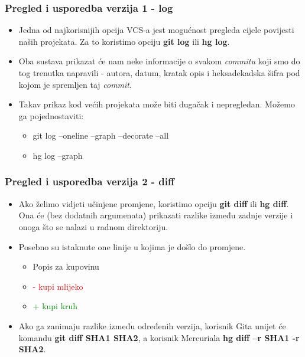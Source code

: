 \documentclass{beamer}
\begin{document}
	\begin{frame}
		\frametitle{Pregled i usporedba verzija 1 - log}
		\begin{itemize}
			\item Jedna od najkorisnijih opcija VCS-a jest mogućnost pregleda cijele povijesti naših projekata. Za to koristimo opciju \textbf{git log} ili \textbf{hg log}.
			\item Oba sustava prikazat će nam neke informacije o svakom \textit{commitu} koji smo do tog trenutka napravili - autora, datum, kratak opis i heksadekadska šifra pod kojom je spremljen taj \textit{commit}.
			\item Takav prikaz kod većih projekata može biti dugačak i nepregledan. Možemo ga pojednostaviti:
			\begin{itemize}
				\item git log --oneline --graph --decorate --all
				\item hg log --graph
			\end{itemize}
		\end{itemize}
	\end{frame}

	\begin{frame}
		\frametitle{Pregled i usporedba verzija 2 - diff}
		\begin{itemize}
			\item Ako želimo vidjeti učinjene promjene, koristimo opciju \textbf{git diff} ili \textbf{hg diff}. Ona će (bez dodatnih argumenata) prikazati razlike između zadnje verzije i onoga što se nalazi u radnom direktoriju.
			\item Posebno su istaknute one linije u kojima je došlo do promjene. \\
			\begin{itemize}						
  				\item Popis za kupovinu
				\item \textcolor{red}{- kupi mlijeko}
				\item \textcolor{green}{+ kupi kruh}
			\end{itemize}
			\item Ako ga zanimaju razlike između određenih verzija, korisnik Gita unijet će komandu \textbf{git diff SHA1 SHA2}, a korisnik Mercuriala \textbf{hg diff –r SHA1 -r SHA2}.
		\end{itemize}
	\end{frame}
\end{document}
